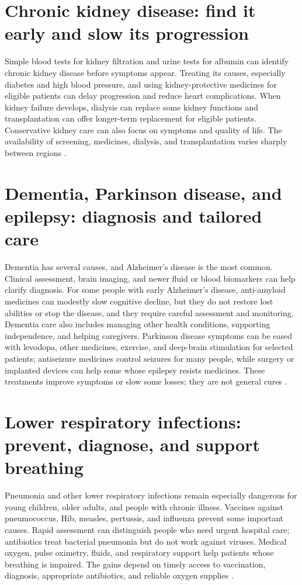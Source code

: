 \documentclass[12pt,oneside]{book}
\begin{document}
\section{Chronic kidney disease: find it early and slow its progression}
Simple blood tests for kidney filtration and urine tests for albumin can
identify chronic kidney disease before symptoms appear. Treating its causes,
especially diabetes and high blood pressure, and using kidney-protective
medicines for eligible patients can delay progression and reduce heart
complications. When kidney failure develops, dialysis can replace some kidney
functions and transplantation can offer longer-term replacement for eligible
patients. Conservative kidney care can also focus on symptoms and quality of
life. The availability of screening, medicines, dialysis, and transplantation
varies sharply between regions \cite{whoCKD2026,kdigoCKD2024}.

\section{Dementia, Parkinson disease, and epilepsy: diagnosis and tailored care}
Dementia has several causes, and Alzheimer's disease is the most common.
Clinical assessment, brain imaging, and newer fluid or blood biomarkers can
help clarify diagnosis. For some people with early Alzheimer's disease,
anti-amyloid medicines can modestly slow cognitive decline, but they do not
restore lost abilities or stop the disease, and they require careful
assessment and monitoring. Dementia care also includes managing other health
conditions, supporting independence, and helping caregivers. Parkinson
disease symptoms can be eased with levodopa, other medicines, exercise, and
deep-brain stimulation for selected patients; antiseizure medicines control
seizures for many people, while surgery or implanted devices can help some
whose epilepsy resists medicines. These treatments improve symptoms or slow
some losses; they are not general cures \cite{whoDementia2026,niaAlzTreatment,nindsDBS,nindsEpilepsy}.

\section{Lower respiratory infections: prevent, diagnose, and support breathing}
Pneumonia and other lower respiratory infections remain especially dangerous
for young children, older adults, and people with chronic illness. Vaccines
against pneumococcus, Hib, measles, pertussis, and influenza prevent some
important causes. Rapid assessment can distinguish people who need urgent
hospital care; antibiotics treat bacterial pneumonia but do not work against
viruses. Medical oxygen, pulse oximetry, fluids, and respiratory support help
patients whose breathing is impaired. The gains depend on timely access to
vaccination, diagnosis, appropriate antibiotics, and reliable oxygen supplies
\cite{whoPneumonia2025}.
\end{document}
